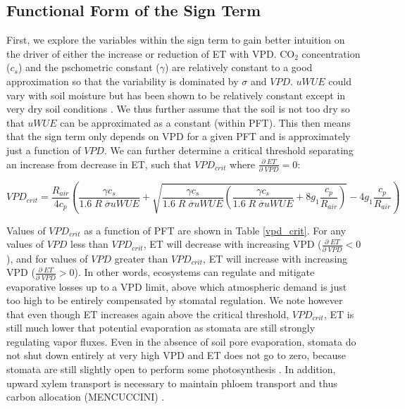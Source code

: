 \documentclass[draft,linenumbers]{agujournal}
\begin{document}
\subsection{Functional Form of the Sign Term}
\label{sign_func}
First, we explore the variables within the sign term to gain better intuition on the driver of either the increase or reduction of ET with VPD. CO$_2$ concentration ($c_s$) and the pschometric constant ($\gamma$) are relatively constant to a good approximation so that the variability is dominated by $\sigma$ and $VPD$. $uWUE$ could vary with soil moisture but has been shown to be relatively constant except in very dry soil conditions \citep{Zhou_2016, Lin_2015}. We thus further assume that the soil is not too dry so that $uWUE$ can be approximated as a constant (within PFT). This then means that the sign term only depends on VPD for a given PFT and is approximately just a function of $VPD$. We can further determine a critical threshold separating an increase from decrease in ET, such that $VPD_{crit}$ where $\frac{\partial \; ET}{\partial \; VPD} = 0$:

\begin{linenomath*}
  \begin{equation}
VPD_{crit} = \frac{R_{air}}{4 c_p} \left( \frac{\gamma c_s}{1.6\; R \; \overline{\sigma} uWUE} + \sqrt{\frac{\gamma c_s}{1.6\; R \; \overline{\sigma} uWUE}\left( \frac{\gamma c_s}{1.6\; R \; \overline{\sigma} uWUE} + 8 g_1 \frac{c_p}{R_{air}}\right)} - 4 g_1 \frac{c_p}{R_{air}} \right)
\label{vpd_min_et}
  \end{equation}
\end{linenomath*}

Values of $VPD_{crit}$ as a function of PFT are shown in Table \ref{vpd_crit}. For any values of $VPD$ less than $VPD_{crit}$, ET will decrease with increasing VPD ($\frac{\partial \; ET}{\partial \; VPD} < 0$), and for values of $VPD$ greater than $VPD_{crit}$, ET will increase with increasing VPD ($\frac{\partial \; ET}{\partial \; VPD} > 0$). In other words, ecosystems can regulate and mitigate evaporative losses up to a VPD limit, above which atmospheric demand is just too high to be entirely compensated by stomatal regulation. We note however that even though ET increases again above the critical threshold, $VPD_{crit}$, ET is still much lower that potential evaporation as stomata are still strongly regulating vapor fluxes. Even in the absence of soil pore evaporation, stomata do not shut down entirely at very high VPD and ET does not go to zero, because stomata are still slightly open to perform some photosynthesis \citep{Ball_1987, Leuning_1990, Medlyn_2011}. In addition, upward xylem transport is necessary to maintain phloem transport and thus carbon allocation (MENCUCCINI) .
\end{document}
